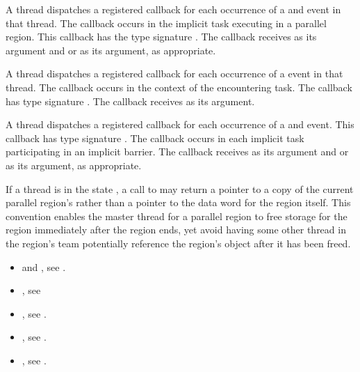 \tools

A thread dispatches a registered 
callback for each occurrence of a  and
 event in that thread.  The callback occurs
in the implicit task executing in a parallel region.
This callback has the type signature
.  The callback receives
 as its  argument and
 or  as its
 argument, as appropriate.

A thread dispatches a registered 
callback for each occurrence of a  event in that thread.
The callback occurs in the context of the encountering task.  The
callback has type signature .  The
callback receives  as its 
argument.

A thread dispatches a registered
 callback for each occurrence
of a  and
 event.  This callback has type
signature .  The callback occurs
in each implicit task participating in an implicit barrier.  The
callback receives  as its 
argument and  or  as
its  argument, as appropriate.

\restrictions
If a thread is in the state ,
a call to 
may return a pointer to a copy of the current parallel region's 
rather than a pointer to the data word for the region itself. This convention enables the master thread
for a parallel region to free storage for the region immediately after the region ends, yet
avoid having some other thread in the region's team
potentially reference the region's  object after it has been freed.

\crossreferences
\begin{itemize}

\item {} and , see
  .

\item {}, see

\item {}, see
  .

\item {}, see
  .

\item {}, see
  .

\end{itemize}









